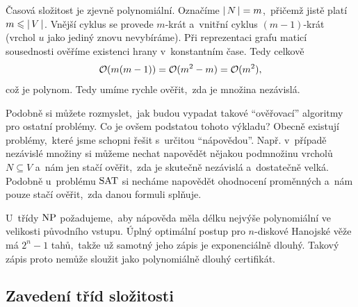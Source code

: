 Časová složitost je zjevně polynomiální. Označíme $\left|\,N\,\right|=m$,~přičemž jistě platí $m\leqslant\left|\,V\,\right|$. Vnější cyklus se provede $m$-krát a~vnitřní cyklus $(m-1)$-krát (vrchol $u$ jako jediný znovu nevybíráme). Při reprezentaci grafu maticí sousednosti ověříme existenci hrany v~konstantním čase. Tedy celkově
\[\mathcal{O}(m(m-1))=\mathcal{O}(m^2-m)=\mathcal{O}(m^2),\]
což je polynom. Tedy umíme rychle ověřit,~zda je množina nezávislá.

Podobně si můžete rozmyslet,~jak budou vypadat takové ``ověřovací'' algoritmy pro ostatní problémy. Co je ovšem podstatou tohoto výkladu? Obecně existují problémy,~které jsme schopni řešit s~určitou ``nápovědou''. Např. v~případě nezávislé množiny si můžeme nechat napovědět nějakou podmnožinu vrcholů $N\subseteq V$ a~nám jen stačí ověřit,~zda je skutečně nezávislá a~dostatečně velká. Podobně u~problému \ensuremath{\SAT} si necháme napovědět ohodnocení proměnných a~nám pouze stačí ověřit,~zda danou formuli splňuje.
\begin{remark}
    U~třídy \ensuremath{\classNP} požadujeme,~aby nápověda měla délku nejvýše polynomiální ve velikosti původního vstupu. Úplný optimální postup pro $n$-diskové Hanojské věže má $2^n-1$ tahů,~takže už samotný jeho zápis je exponenciálně dlouhý. Takový zápis proto nemůže sloužit jako polynomiálně dlouhý certifikát.
\end{remark}

\subsection{Zavedení tříd složitosti}\label{subsec:tridy_slozitosti}

